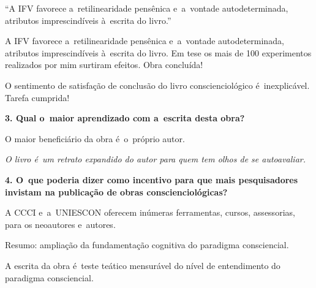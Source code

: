 \documentclass{gescons}
\begin{document}
\begin{multicols}{2}
\begin{pullquote}
``A IFV favorece a~retilinearidade pensênica e~a~vontade autodeterminada, atributos imprescindíveis à~escrita do livro.''
\end{pullquote}

A IFV favorece a~retilinearidade pensênica e~a~vontade autodeterminada, atributos imprescindíveis à~escrita do livro. Em tese os mais de 100 experimentos realizados por mim surtiram efeitos. Obra concluída!

O sentimento de satisfação de conclusão do livro conscienciológico é~inexplicável. Tarefa cumprida!

\textbf{3. Qual o~maior aprendizado com a~escrita desta obra?}

O maior beneficiário da obra é~o~próprio autor.

\emph{O livro é~um retrato expandido do autor para quem tem olhos de se autoavaliar.}


\textbf{4. O~que poderia dizer como incentivo para que mais pesquisadores invistam na publicação de obras conscienciológicas?}

A CCCI e~a~UNIESCON oferecem inúmeras ferramentas, cursos, assessorias, para os neoautores e~autores.

Resumo: ampliação da fundamentação cognitiva do paradigma consciencial.

A escrita da obra é~teste teático mensurável do nível de entendimento do paradigma consciencial.


    
    \end{multicols}
\end{document}

